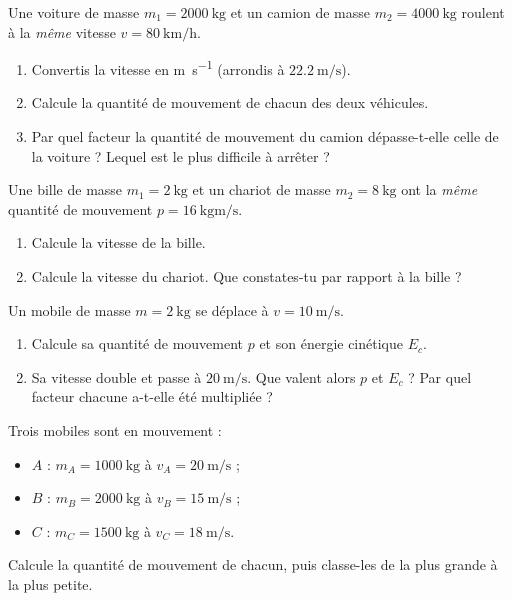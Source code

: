 \documentclass[11pt,a4paper]{article}
\begin{document}

\begin{exo}
Une voiture de masse $m_1=\qty{2000}{\kilogram}$ et un camion de masse $m_2=\qty{4000}{\kilogram}$
roulent à la \emph{même} vitesse $v=\qty{80}{\kilo\metre\per\hour}$.
\begin{enumerate}[label=\alph*)]
  \item Convertis la vitesse en \si{\metre\per\second} (arrondis à $\qty{22,2}{\metre\per\second}$).
  \item Calcule la quantité de mouvement de chacun des deux véhicules.
  \item Par quel facteur la quantité de mouvement du camion dépasse-t-elle celle de la voiture ?
        Lequel est le plus difficile à arrêter ?
\end{enumerate}
\end{exo}

\begin{exo}
Une bille de masse $m_1=\qty{2}{\kilogram}$ et un chariot de masse $m_2=\qty{8}{\kilogram}$ ont la
\emph{même} quantité de mouvement $p=\qty{16}{\kilogram\metre\per\second}$.
\begin{enumerate}[label=\alph*)]
  \item Calcule la vitesse de la bille.
  \item Calcule la vitesse du chariot. Que constates-tu par rapport à la bille ?
\end{enumerate}
\end{exo}

\begin{exo}
Un mobile de masse $m=\qty{2}{\kilogram}$ se déplace à $v=\qty{10}{\metre\per\second}$.
\begin{enumerate}[label=\alph*)]
  \item Calcule sa quantité de mouvement $p$ et son énergie cinétique $E_c$.
  \item Sa vitesse double et passe à $\qty{20}{\metre\per\second}$. Que valent alors $p$ et $E_c$ ?
        Par quel facteur chacune a-t-elle été multipliée ?
\end{enumerate}
\end{exo}

\begin{exo}
Trois mobiles sont en mouvement :
\begin{itemize}[leftmargin=1.6em,topsep=1pt,itemsep=1pt]
  \item $A$ : $m_A=\qty{1000}{\kilogram}$ à $v_A=\qty{20}{\metre\per\second}$ ;
  \item $B$ : $m_B=\qty{2000}{\kilogram}$ à $v_B=\qty{15}{\metre\per\second}$ ;
  \item $C$ : $m_C=\qty{1500}{\kilogram}$ à $v_C=\qty{18}{\metre\per\second}$.
\end{itemize}
Calcule la quantité de mouvement de chacun, puis classe-les de la plus grande à la plus petite.
\end{exo}
\end{document}

